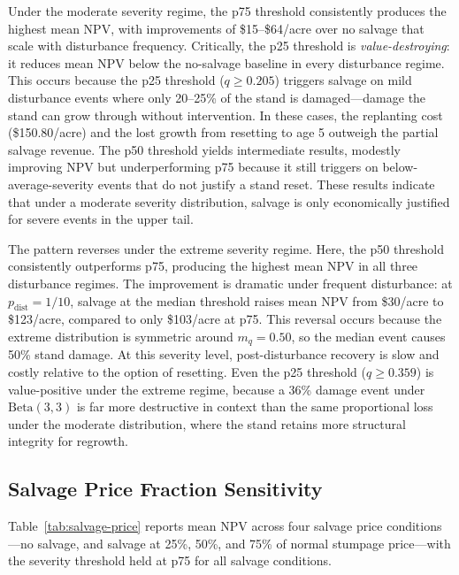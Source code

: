 \documentclass[12pt]{report}
\begin{document}
Under the moderate severity regime, the p75 threshold consistently produces the highest mean NPV, with improvements of \$15--\$64/acre over no salvage that scale with disturbance frequency. Critically, the p25 threshold is \textit{value-destroying}: it reduces mean NPV below the no-salvage baseline in every disturbance regime. This occurs because the p25 threshold ($q \geq 0.205$) triggers salvage on mild disturbance events where only 20--25\% of the stand is damaged---damage the stand can grow through without intervention. In these cases, the replanting cost (\$150.80/acre) and the lost growth from resetting to age 5 outweigh the partial salvage revenue. The p50 threshold yields intermediate results, modestly improving NPV but underperforming p75 because it still triggers on below-average-severity events that do not justify a stand reset. These results indicate that under a moderate severity distribution, salvage is only economically justified for severe events in the upper tail.

The pattern reverses under the extreme severity regime. Here, the p50 threshold consistently outperforms p75, producing the highest mean NPV in all three disturbance regimes. The improvement is dramatic under frequent disturbance: at $p_{\text{dist}} = 1/10$, salvage at the median threshold raises mean NPV from \$30/acre to \$123/acre, compared to only \$103/acre at p75. This reversal occurs because the extreme distribution is symmetric around $m_q = 0.50$, so the median event causes 50\% stand damage. At this severity level, post-disturbance recovery is slow and costly relative to the option of resetting. Even the p25 threshold ($q \geq 0.359$) is value-positive under the extreme regime, because a 36\% damage event under $\text{Beta}(3, 3)$ is far more destructive in context than the same proportional loss under the moderate distribution, where the stand retains more structural integrity for regrowth.

\subsection{Salvage Price Fraction Sensitivity}

Table~\ref{tab:salvage-price} reports mean NPV across four salvage price conditions---no salvage, and salvage at 25\%, 50\%, and 75\% of normal stumpage price---with the severity threshold held at p75 for all salvage conditions.
\end{document}
